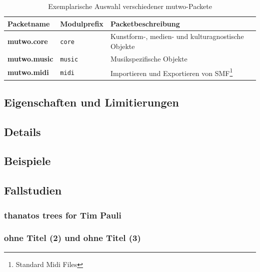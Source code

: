 \documentclass[12pt,a4paper,ngerman]{article}
\begin{document}
\begin{table}[h!]
    \begin{center}
        \begin{tabular}{l l l} 
            \hline
            Packetname & Modulprefix & Packetbeschreibung \\ [0.5ex] 
            \hline\hline
            \textbf{mutwo.core} & \texttt{core} & Kunstform-, medien- und kulturagnostische Objekte \\
            \textbf{mutwo.music} & \texttt{music} & Musikspezifische Objekte \\
            \textbf{mutwo.midi} & \texttt{midi} & Importieren und Exportieren von SMF\footnote{Standard Midi Files} \\
            \hline
        \end{tabular}
    \end{center}

    \caption{Exemplarische Auswahl verschiedener mutwo-Packete}

\end{table}



\subsection{Eigenschaften und Limitierungen}

\subsection{Details}

\subsection{Beispiele}


\subsection{Fallstudien}

\subsubsection{thanatos trees for Tim Pauli}

\subsubsection{ohne Titel (2) und ohne Titel (3)}
\end{document}
